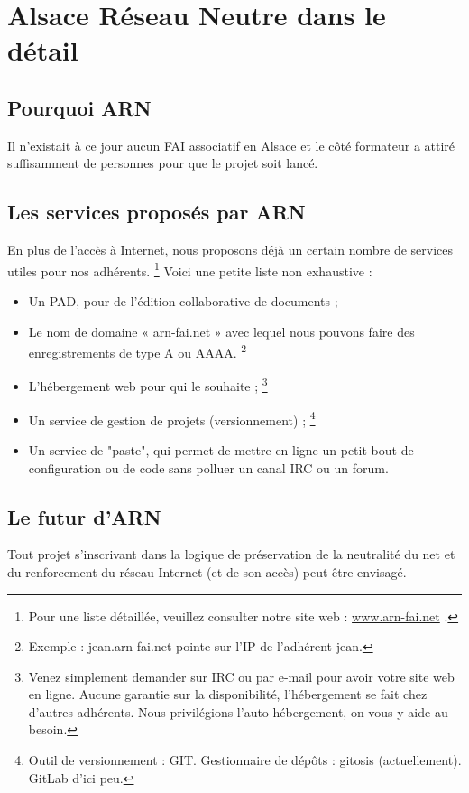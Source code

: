 \section{Alsace Réseau Neutre dans le détail}

\subsection{Pourquoi ARN}
Il n'existait à ce jour aucun FAI associatif en Alsace et le côté 
formateur a attiré suffisamment de personnes pour que le projet soit lancé.

\subsection{Les services proposés par ARN}
En plus de l'accès à Internet, nous proposons déjà un certain nombre de 
services utiles pour nos adhérents.
\protect\footnote{
	Pour une liste détaillée, veuillez consulter notre site web : 
		\href{http://www.arn-fai.net}{www.arn-fai.net} .
}
Voici une petite liste non exhaustive :
\begin{itemize}
	\item Un PAD, pour de l'édition collaborative de documents ;
	\item Le nom de domaine « arn-fai.net » avec lequel nous pouvons faire 
	des enregistrements de type A ou AAAA.
	\protect\footnote{
		Exemple : jean.arn-fai.net pointe sur l'IP de l'adhérent jean.
	}
	\item L'hébergement web pour qui le souhaite ;
	\protect\footnote{
		Venez simplement demander sur IRC ou par e-mail pour avoir votre site web en ligne. 
		Aucune garantie sur la disponibilité, l'hébergement se fait chez d'autres adhérents. 
		Nous privilégions l'auto-hébergement, on vous y aide au besoin.
	}
	\item Un service de gestion de projets (versionnement) ;
	\protect\footnote{
		Outil de versionnement : GIT. 
		Gestionnaire de dépôts : gitosis (actuellement). GitLab d'ici peu.
	}
	\item Un service de "paste", qui permet de mettre en ligne un petit bout 
	de configuration ou de code sans polluer un canal IRC ou un forum.
\end{itemize}

\subsection{Le futur d'ARN}
Tout projet s'inscrivant dans la logique de préservation de la neutralité du net 
et du renforcement du réseau Internet (et de son accès) peut être envisagé.
